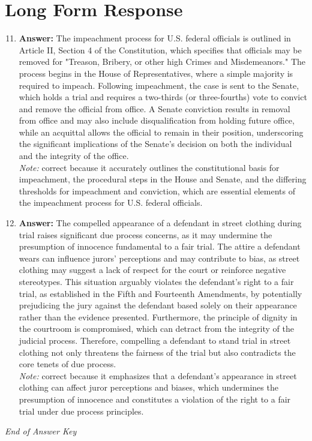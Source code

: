 \documentclass[12pt]{article}
\begin{document}
\section*{Long Form Response}
\begin{enumerate}[label=\arabic*.]
\setcounter{enumi}{10}
\item \textbf{Answer:} The impeachment process for U.S. federal officials is outlined in Article II, Section 4 of the Constitution, which specifies that officials may be removed for "Treason, Bribery, or other high Crimes and Misdemeanors." The process begins in the House of Representatives, where a simple majority is required to impeach. Following impeachment, the case is sent to the Senate, which holds a trial and requires a two-thirds (or three-fourths) vote to convict and remove the official from office. A Senate conviction results in removal from office and may also include disqualification from holding future office, while an acquittal allows the official to remain in their position, underscoring the significant implications of the Senate's decision on both the individual and the integrity of the office.
\\ \textit{Note:} correct because it accurately outlines the constitutional basis for impeachment, the procedural steps in the House and Senate, and the differing thresholds for impeachment and conviction, which are essential elements of the impeachment process for U.S. federal officials.
\item \textbf{Answer:} The compelled appearance of a defendant in street clothing during trial raises significant due process concerns, as it may undermine the presumption of innocence fundamental to a fair trial. The attire a defendant wears can influence jurors' perceptions and may contribute to bias, as street clothing may suggest a lack of respect for the court or reinforce negative stereotypes. This situation arguably violates the defendant's right to a fair trial, as established in the Fifth and Fourteenth Amendments, by potentially prejudicing the jury against the defendant based solely on their appearance rather than the evidence presented. Furthermore, the principle of dignity in the courtroom is compromised, which can detract from the integrity of the judicial process. Therefore, compelling a defendant to stand trial in street clothing not only threatens the fairness of the trial but also contradicts the core tenets of due process.
\\ \textit{Note:} correct because it emphasizes that a defendant's appearance in street clothing can affect juror perceptions and biases, which undermines the presumption of innocence and constitutes a violation of the right to a fair trial under due process principles.
\end{enumerate}

\vfill
\noindent\textit{End of Answer Key}
\end{document}
